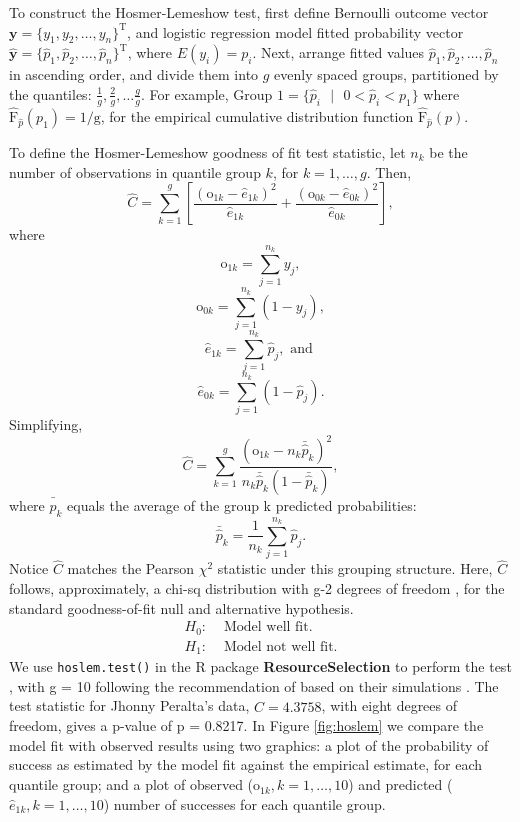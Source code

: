 To construct the Hosmer-Lemeshow test, first define Bernoulli outcome vector $\pmb{y} = \{y_{1}, y_{2}, \dots, y_{n}\}^{\text{T}}$, and logistic regression model fitted probability vector $\hat{\pmb{y}} = \{\hat{p}_{1}, \hat{p}_{2}, \dots, \hat{p}_{n}\}^{\text{T}}$, where $E(y_{i}) = p_{i}$. Next, arrange fitted values $\hat{p}_{1}, \hat{p}_{2}, \dots, \hat{p}_{n}$ in ascending order, and divide them into $g$ evenly spaced groups, partitioned by the quantiles: $\frac{1}{g}, \frac{2}{g}, \dots \frac{g}{g}$. For example, $\text{Group 1} = \{\hat{p}_{i}\text{ }|\text{ }0 < \hat{p}_{i} < p_{1}\}$ where $\hat{\text{F}}_{\hat{p}}(p_{1})=1/\text{g}$, for the empirical cumulative distribution function $\hat{\text{F}}_{\hat{p}}(p)$. 

To define the Hosmer-Lemeshow goodness of fit test statistic, let $n_{k}$ be the number of observations in quantile group $k$, for $k = 1, \dots, g$. Then,
$$ \widehat{C} = \sum_{k=1}^{g} \left[ \frac{(\text{o}_{1k}-\hat{e}_{1k})^{2}}{\hat{e}_{1k}} + \frac{(\text{o}_{0k}-\hat{e}_{0k})^{2}}{\hat{e}_{0k}}  \right], $$
where
$$ \text{o}_{1k} =  \sum_{j=1}^{n_{k}}y_{j},$$
$$ \text{o}_{0k} =  \sum_{j=1}^{n_{k}}(1-y_{j}),$$
$$ \hat{e}_{1k} = \sum_{j=1}^{n_{k}}\hat{p}_{j}, \text{ and }$$
$$ \hat{e}_{0k} = \sum_{j=1}^{n_{k}}(1-\hat{p}_{j}).$$
Simplifying, 
$$ \widehat{C} = \sum_{k=1}^{g} \frac{(\text{o}_{1k}-n_{k}\bar{\hat{p}}_{k})^{2}}{n_{k}\bar{\hat{p}}_{k}(1-\bar{\hat{p}}_{k})},$$
where $\bar{\hat{p}}_{k}$ equals the average of the group k predicted probabilities:
$$\bar{\hat{p}}_{k} = \frac{1}{n_{k}}\sum_{j=1}^{n_{k}}\hat{p}_{j}.$$
Notice $\widehat{C}$ matches the Pearson $\chi^{2}$ statistic under this grouping structure. Here, $\widehat{C}$ follows, approximately, a chi-sq distribution with g-2 degrees of freedom \citep{Hosmer1980}, for the standard goodness-of-fit null and alternative hypothesis.
\begin{align}
H_{0}: & \text{ Model well fit.} \\
H_{1}: & \text{ Model not well fit.}
\end{align}
We use \verb|hoslem.test()| in the R package {\bf ResourceSelection} to perform the test \citep{hoslem}, with g = 10 following the recommendation of \cite{Hosmer2013} based on their simulations \citep{Hosmer1980}. The test statistic for Jhonny Peralta's data, $\widehat{C} = 4.3758$, with eight degrees of freedom, gives a p-value of p = 0.8217. In Figure \ref{fig:hoslem} we compare the model fit with observed results using two graphics: a plot of the probability of success as estimated by the model fit against the empirical estimate, for each quantile group; and a plot of observed ($\text{o}_{1k}, k = 1,\dots,10$) and predicted ($\hat{e}_{1k}, k = 1,\dots,10$) number of successes for each quantile group.
